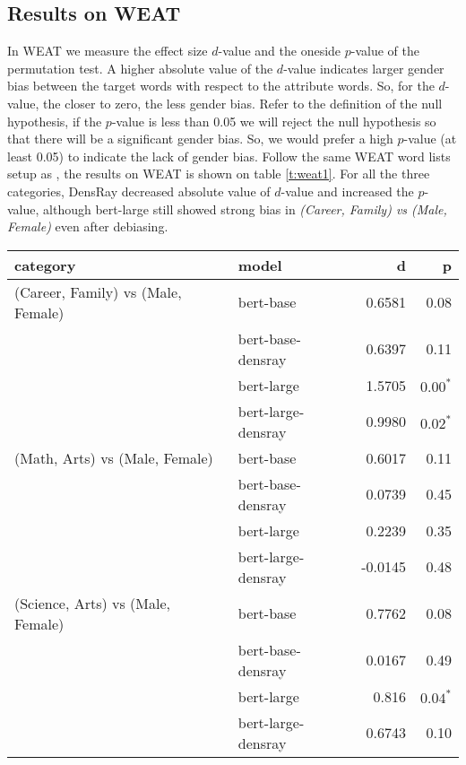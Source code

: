 \subsection{Results on WEAT}
In WEAT we measure the effect size $d$-value and the oneside $p$-value of the permutation test. A higher absolute value of the $d$-value indicates larger gender bias between the target words with respect to the attribute words. So, for the $d$-value, the closer to zero, the less gender bias. Refer to the definition of the null hypothesis, if the $p$-value is less than 0.05 we will reject the null hypothesis so that there will be a significant gender bias. So, we would prefer a high $p$-value (at least 0.05) to indicate the lack of gender bias. Follow the same WEAT word lists setup as \citet{karve2019conceptor}, the results on WEAT is shown on table \ref{t:weat1}. For all the three categories, DensRay decreased absolute value of $d$-value and increased the $p$-value, although bert-large still showed strong bias in \textit{(Career, Family) vs (Male, Female)} even after debiasing.
\begin{table*}[ht]
\centering
\footnotesize
\begin{tabular}{llrr}
\hline
category & model & d & p\\
\hline
(Career, Family) vs (Male, Female) & bert-base & 0.6581 & 0.08 \\
                  & bert-base-densray & 0.6397 & 0.11\\
                  & bert-large & 1.5705 & $0.00^{*}$ \\
                  & bert-large-densray & 0.9980 & $0.02^{*}$\\
\hline
(Math, Arts) vs (Male, Female) & bert-base & 0.6017 & 0.11 \\
                  & bert-base-densray & 0.0739 & 0.45\\
                  & bert-large & 0.2239 & 0.35 \\
                  & bert-large-densray & -0.0145 & 0.48\\
\hline
(Science, Arts) vs (Male, Female) & bert-base & 0.7762 & 0.08 \\
                  & bert-base-densray & 0.0167 & 0.49\\
                  & bert-large & 0.816 & $0.04^{*}$  \\
                  & bert-large-densray & 0.6743 & 0.10\\
\hline
\end{tabular}
\caption{\label{t:weat1}
BERT debiasing results on WEAT. * shows significant gender bias.}
\end{table*}

